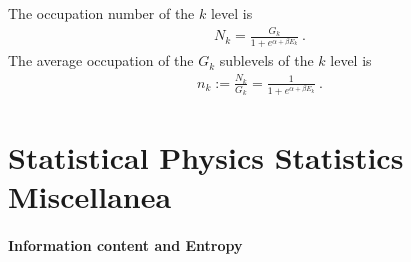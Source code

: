 \documentclass[letterpaper,10pt,english]{jupyterBook}
\begin{document}
\sphinxAtStartPar
The occupation number of the \(k\) level is
\begin{equation*}
\begin{split}N_k = \frac{G_k}{1 + e^{\alpha + \beta E_k}} \ .\end{split}
\end{equation*}
\sphinxAtStartPar
The average occupation of the \(G_k\) sublevels of the \(k\) level is
\begin{equation*}
\begin{split}n_k := \frac{N_k}{G_k} = \frac{1}{1 + e^{\alpha + \beta E_k}} \ .\end{split}
\end{equation*}\subsubsection*{}

\sphinxstepscope


\chapter{Statistical Physics \sphinxhyphen{} Statistics Miscellanea}
\label{\detokenize{ch/statistical-mechanics/statistics:statistical-physics-statistics-miscellanea}}\label{\detokenize{ch/statistical-mechanics/statistics:statistical-mechanics-statistics}}\label{\detokenize{ch/statistical-mechanics/statistics::doc}}\subsubsection*{Information content and Entropy}
\end{document}
